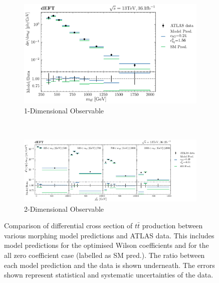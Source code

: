 \documentclass[a4paper,11pt]{article}
\begin{document}
\begin{figure}[H]
    \centering
    \begin{subfigure}[b]{0.8\textwidth}
        \centering
        \includegraphics[width=\textwidth]{plots/ATLAS_model_result_1D_2OP.png}
        \caption{1-Dimensional Observable}
        \label{fig:model_result_1D_2OP}
    \end{subfigure}
    ~
    \begin{subfigure}[b]{\textwidth}
        \centering
        \includegraphics[width=\textwidth]{plots/ATLAS_model_result_2D_2OP.png}
        \caption{2-Dimensional Observable}
        \label{fig:model_result_2D_2OP}
    \end{subfigure}
    \centering
    \caption{Comparison of differential cross section of $t\bar{t}$ production between various morphing model predictions and ATLAS data. This includes model predictions for the optimised Wilson coefficients and for the all zero coefficient case (labelled as SM pred.). The ratio between each model prediction and the data is shown underneath. The errors shown represent statistical and systematic uncertainties of the data.}
    \label{fig:model_result_2OP}
\end{figure}
\end{document}

